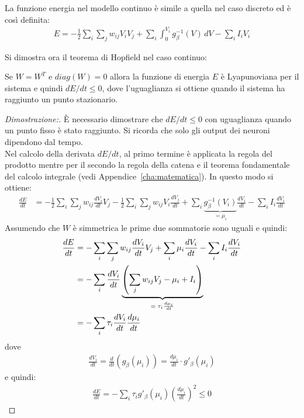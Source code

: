 		\newpage

		La funzione energia nel modello continuo è simile a quella nel caso discreto ed è così definita:
		\begin{align}
			E = - \frac{1}{2} \sum_i \sum_j w_{ij} V_i V_j + \sum_i \int_0^{V_i} g^{-1}_\beta (V) \, dV - \sum_i I_i V_i
		\end{align}

		Si dimostra ora il teorema di Hopfield nel caso continuo: 
		\begin{thm}
			Se $W=W^T$ e $diag(W) = 0$ allora la funzione di energia $E$ è Lyapunoviana per il sistema e quindi $dE / dt \leq 0$, dove l'uguaglianza si ottiene quando il sistema ha raggiunto un punto stazionario.
		\end{thm}

		\begin{proof}[Dimostrazione:]
			È necessario dimostrare che $dE / dt \leq 0$ con uguaglianza quando un punto fisso è stato raggiunto. Si ricorda che solo gli output dei neuroni dipendono dal tempo.\\
	
			Nel calcolo della derivata $dE / dt$, al primo termine è applicata la regola del prodotto mentre per il secondo la regola della catena e il teorema fondamentale del calcolo integrale (vedi Appendice~\ref{cha:matematica}). In questo modo si ottiene:
			\begin{align*}
				\frac{dE}{dt} &= - \frac{1}{2} \sum_i \sum_j w_{ij} \frac{dV_i}{dt} V_j - \frac{1}{2} \sum_i \sum_j w_{ij} V_i \frac{dV_j}{dt} + \sum_i \underbrace{g_\beta^{-1}(V_i)}_\textrm{$= \mu_i$} \frac{dV_i}{dt} - \sum_i I_i \frac{d V_i}{dt} 
			\end{align*}
			Assumendo che $W$ è simmetrica le prime due sommatorie sono uguali e quindi:
			\begin{align*}
				\frac{dE}{dt} &=  - \sum_i \sum_j w_{ij} \frac{dV_i}{dt} V_j + \sum_i \mu_i \frac{dV_i}{dt} - \sum_i I_i \frac{d V_i}{dt} \\
				&= - \sum_i \frac{d V_i}{dt} \underbrace{\left(\sum_j w_{ij} V_j - \mu_i + I_i \right)}_\textrm{$ = \tau_i \frac{d \mu_i}{dt}$} \\
				&= - \sum_i \tau_i \frac{d V_i}{dt} \frac{d \mu_i}{dt}
			\end{align*}
			dove
			\begin{align*}
				\frac{d V_i}{dt} = \frac{d}{dt} \left(g_\beta (\mu_i) \right) = \frac{d \mu_i}{dt} \cdot g'_\beta(\mu_i)
			\end{align*}
			e quindi:
			\begin{align*}
				\frac{dE}{dt} = - \sum_i \tau_i g'_\beta(\mu_i) \left(\frac{d\mu_i}{dt} \right)^2 \leq 0
			\end{align*}
	

\end{proof}
